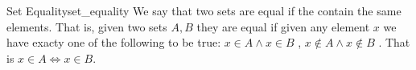\begin{definition}{Set Equality}{set_equality}
We say that two sets are equal if the contain the same elements. That is, given
two sets \( A, B \) they are equal if given any element \( x \) we have exacty
one of the following to be true: \( x \in  A \land  x \in  B \) , \( x \not\in A
\land  x \not\in B\) . That is \( x \in  A \Leftrightarrow x \in  B \).
\end{definition}

